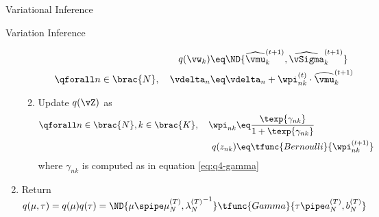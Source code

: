\documentclass{article}
\begin{document}
\begin{question}
\begin{qsection}{Variational Inference}
\begin{algo}[0.9\textwidth]{Variation Inference}
\begin{enumerate}
\begin{enumerate}
\begin{enumerate}
\begin{align*}
										q(\vw_k)	&\eq	\ND{\widehat{\vmu}_k^{(t + 1)}, \widehat{\vSigma}_k^{(t + 1)}} \\
										\qforall n \in \brac{N}, \quad \vdelta_n	&\eq	\vdelta_n + \wpi_{nk}^{(t)} \cdot \widehat{\vmu}_{k}^{(t + 1)} \\
									\end{align*}
							\end{enumerate}
						\item Update $q(\vZ)$ as
							\begin{align*}
								\qforall n \in \brac{N}, k \in \brac{K}, \quad \wpi_{nk}	&\eq	\frac{\texp{\gamma_{nk}}}{1 + \texp{\gamma_{nk}}} && \\
								q(z_{nk})	&\eq	\tfunc{Bernoulli}{\wpi_{nk}^{(t + 1)}}
							\end{align*}
							where $\gamma_{nk}$ is computed as in equation \ref{eq:q4-gamma}
					\end{enumerate}
				\item Return $q(\mu, \tau) = q(\mu) q(\tau) = \ND{\mu \spipe \mu_N^{(T)}, {\lambda_N^{(T)}}^{-1}} \tfunc{Gamma}{\tau \pipe a_N^{(T)}, b_N^{(T)}}$
			\end{enumerate}

		\end{algo}

	\end{qsection}

\end{question}
\end{document}

